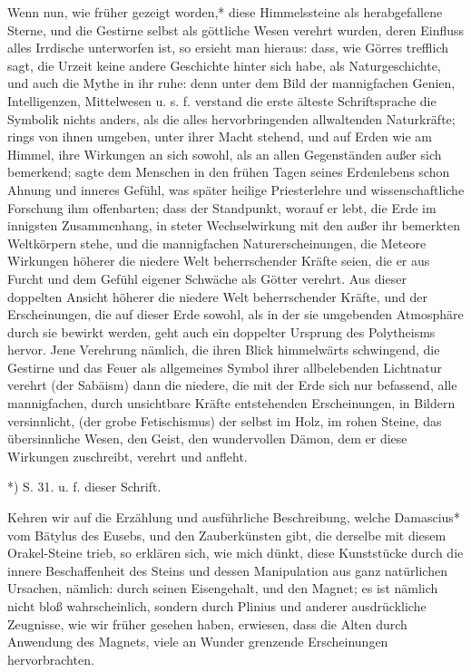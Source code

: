 \documentclass[a4paper, 11pt, oneside, polutonikogreek, german]{article}
\begin{document}
Wenn nun, wie früher gezeigt worden,* diese Himmelssteine als herabgefallene Sterne, und die Gestirne selbst als göttliche Wesen verehrt wurden, deren Einfluss alles Irrdische unterworfen ist, so ersieht man hieraus: dass, wie Görres trefflich sagt, die Urzeit keine andere Geschichte hinter sich habe, als Naturgeschichte, und auch die Mythe in ihr ruhe: denn unter dem Bild der mannigfachen Genien, Intelligenzen, Mittelwesen u. s. f. verstand die erste älteste Schriftsprache die Symbolik nichts anders, als die alles hervorbringenden allwaltenden Naturkräfte; rings von ihnen umgeben, unter ihrer Macht stehend, und auf Erden wie am Himmel, ihre Wirkungen an sich sowohl, als an allen Gegenständen außer sich bemerkend; sagte dem Menschen in den frühen Tagen seines Erdenlebens schon Ahnung und inneres Gefühl, was später heilige Priesterlehre und wissenschaftliche Forschung ihm offenbarten; dass der Standpunkt, worauf er lebt, die Erde im innigsten Zusammenhang, in steter Wechselwirkung mit den außer ihr bemerkten Weltkörpern stehe, und die mannigfachen Naturerscheinungen, die Meteore Wirkungen höherer die niedere Welt beherrschender Kräfte seien, die er aus Furcht und dem Gefühl eigener Schwäche als Götter verehrt. Aus dieser doppelten Ansicht höherer die niedere Welt beherrschender Kräfte, und der Erscheinungen, die auf dieser Erde sowohl, als in der sie umgebenden Atmosphäre durch sie bewirkt werden, geht auch ein doppelter Ursprung des Polytheisms hervor. Jene Verehrung nämlich, die ihren Blick himmelwärts schwingend, die Gestirne und das Feuer als allgemeines Symbol ihrer allbelebenden Lichtnatur verehrt (der Sabäism) dann die niedere, die mit der Erde sich nur befassend, alle mannigfachen, durch unsichtbare Kräfte entstehenden Erscheinungen, in Bildern versinnlicht, (der grobe Fetischismus) der selbst im Holz, im rohen Steine, das übersinnliche Wesen, den Geist, den wundervollen Dämon, dem er diese Wirkungen zuschreibt, verehrt und anfleht.

*) S. 31. u. f. dieser Schrift.

Kehren wir auf die Erzählung und ausführliche Beschreibung, welche Damascius* vom Bätylus des Eusebs, und den Zauberkünsten gibt, die derselbe mit diesem Orakel-Steine trieb, so erklären sich, wie mich dünkt, diese Kunststücke durch die innere Beschaffenheit des Steins und dessen Manipulation aus ganz natürlichen Ursachen, nämlich: durch seinen Eisengehalt, und den Magnet; es ist nämlich nicht bloß wahrscheinlich, sondern durch Plinius und anderer ausdrückliche Zeugnisse, wie wir früher gesehen haben, erwiesen, dass die Alten durch Anwendung des Magnets, viele an Wunder grenzende Erscheinungen hervorbrachten.
\end{document}
